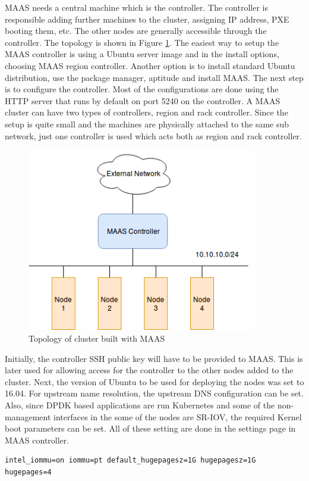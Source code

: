\documentclass[english, 12pt, a4paper, elec, utf8, a-1b, online]{aaltothesis}
\begin{document}
MAAS needs a central machine which is the controller. The controller is responsible adding further machines to the cluster, assigning IP address, PXE booting them, etc. The other nodes are generally accessible through the controller. The topology is shown in Figure \ref{fig-maas-topo}. The easiest way to setup the MAAS controller is using a Ubuntu server image and in the install options, choosing MAAS region controller. Another option is to install standard Ubuntu distribution, use the package manager, aptitude and install MAAS. The next step is to configure the controller. Most of the configurations are done using the HTTP server that runs by default on port 5240 on the controller. A MAAS cluster can have two types of controllers, region and rack controller. Since the setup is quite small and the machines are physically attached to the same sub network, just one controller is used which acts both as region and rack controller. 

\begin{figure}[htb]
\begin{center}
\includegraphics[height=8cm]{pics/maas-topo.png}
\end{center}
\caption{Topology of cluster built with MAAS}
\label{fig-maas-topo}
\end{figure}

Initially, the controller SSH public key will have to be provided to MAAS. This is later used for allowing access for the controller to the other nodes added to the cluster. Next, the version of Ubuntu to be used for deploying the nodes was set to 16.04. For upstream name resolution, the upstream DNS configuration can be set. Also, since DPDK based applications are run Kubernetes and some of the non-management interfaces in the some of the nodes are SR-IOV, the required Kernel boot parameters can be set. All of these setting are done in the settings page in MAAS controller. 
\begin{lstlisting}[basicstyle={\small\ttfamily}]
intel_iommu=on iommu=pt default_hugepagesz=1G hugepagesz=1G hugepages=4
\end{lstlisting}
\end{document}
